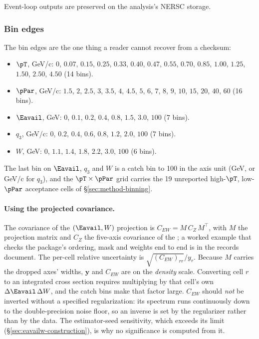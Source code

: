 Event-loop outputs are preserved on the analysis's NERSC storage.

\subsubsection{Bin edges}
\label{app:release-edges}

\noindent The bin edges are the one thing a reader cannot recover from a checksum:
\begin{itemize}[nosep,leftmargin=2em]
  \item $\pT$, \si{GeV/c}: $0$, $0.07$, $0.15$, $0.25$, $0.33$, $0.40$, $0.47$, $0.55$, $0.70$, $0.85$, $1.00$, $1.25$, $1.50$, $2.50$, $4.50$ (14 bins).
  \item $\pPar$, \si{GeV/c}: $1.5$, $2$, $2.5$, $3$, $3.5$, $4$, $4.5$, $5$, $6$, $7$, $8$, $9$, $10$, $15$, $20$, $40$, $60$ (16 bins).
  \item $\Eavail$, \si{GeV}: $0$, $0.1$, $0.2$, $0.4$, $0.8$, $1.5$, $3.0$, $100$ (7 bins).
  \item $q_{3}$, \si{GeV/c}: $0$, $0.2$, $0.4$, $0.6$, $0.8$, $1.2$, $2.0$, $100$ (7 bins).
  \item $W$, \si{GeV}: $0$, $1.1$, $1.4$, $1.8$, $2.2$, $3.0$, $100$ (6 bins).
\end{itemize}
The last bin on $\Eavail$, $q_{3}$ and $W$ is a catch bin to 100 in the axis unit (\si{GeV}, or \si{GeV/c} for $q_{3}$), and the $\pT\times\pPar$ grid carries the 19 unreported high-$\pT$, low-$\pPar$ acceptance cells of \S\ref{sec:method-binning}.

\paragraph{Using the projected covariance.} The covariance of the $(\Eavail,W)$ projection is $C_{EW}=M\,C_{Z}\,M^{\top}$, with $M$ the projection matrix and $C_{Z}$ the five-axis covariance of the \resFiveAxis{}; a worked example that checks the package's ordering, mask and weights end to end is in the records document. The per-cell relative uncertainty is $\sqrt{(C_{EW})_{rr}}/y_{r}$. Because $M$ carries the dropped axes' widths, $\mathbf{y}$ and $C_{EW}$ are on the \emph{density} scale. Converting cell $r$ to an integrated cross section requires multiplying by that cell's own $\Delta\Eavail\,\Delta W$, and the catch bins make that factor large. $C_{EW}$ should \emph{not} be inverted without a specified regularization: its spectrum runs continuously down to the double-precision noise floor, so an inverse is set by the regularizer rather than by the data. The estimator-seed sensitivity, which exceeds its limit (\S\ref{sec:eavailw-construction}), is why no significance is computed from it.

